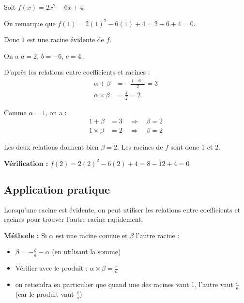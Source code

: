 \documentclass[11pt,a4paper]{article}
\begin{document}
	\begin{exemple}
		Soit $f(x) = 2x^2 - 6x + 4$.
		
		On remarque que $f(1) = 2(1)^2 - 6(1) + 4 = 2 - 6 + 4 = 0$.
		
		Donc $1$ est une racine évidente de $f$.
		
		On a $a = 2$, $b = -6$, $c = 4$.
		
		D'après les relations entre coefficients et racines :
		\begin{align*}
			\alpha + \beta &= -\frac{(-6)}{2} = 3 \\
			\alpha \times \beta &= \frac{4}{2} = 2
		\end{align*}
		
		Comme $\alpha = 1$, on a :
		\begin{align*}
			1 + \beta &= 3 \quad \Rightarrow \quad \beta = 2 \\
			1 \times \beta &= 2 \quad \Rightarrow \quad \beta = 2
		\end{align*}
		
		Les deux relations donnent bien $\beta = 2$. Les racines de $f$ sont donc $1$ et $2$.
		
		\textbf{Vérification :} $f(2) = 2(2)^2 - 6(2) + 4 = 8 - 12 + 4 = 0$ 
	\end{exemple}
	
	\subsection{Application pratique}
	
	\begin{methode}
		Lorsqu'une racine est évidente, on peut utiliser les relations entre coefficients et racines pour trouver l'autre racine rapidement.
		
		\textbf{Méthode :} Si $\alpha$ est une racine connue et $\beta$ l'autre racine :
		\begin{itemize}
			\item $\beta = -\frac{b}{a} - \alpha$ (en utilisant la somme)
			\item Vérifier avec le produit : $\alpha \times \beta = \frac{c}{a}$
			\item on retiendra en particulier que quand une des racines vaut 1, l'autre vaut $\frac{c}{a}$ (car le produit vaut $\frac{c}{a}$)
		\end{itemize}
	\end{methode}
	
\end{document}
